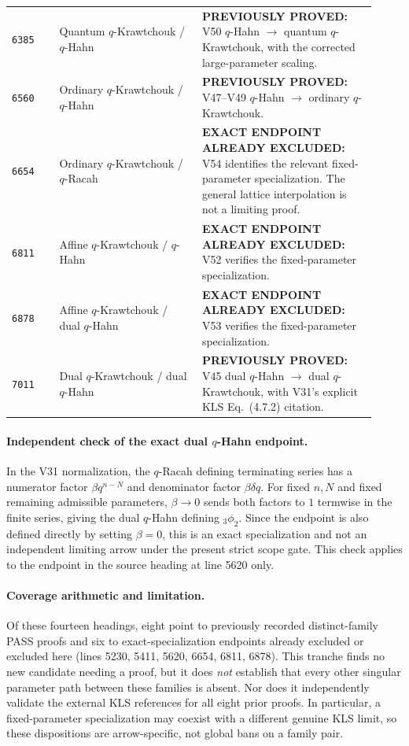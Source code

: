 \documentclass[11pt]{article}
\begin{document}
\begin{longtable}{@{}p{0.12\linewidth}p{0.36\linewidth}p{0.44\linewidth}@{}}
\texttt{6385} & Quantum $q$-Krawtchouk / $q$-Hahn & \textbf{PREVIOUSLY PROVED:} V50 $q$-Hahn $\to$ quantum $q$-Krawtchouk, with the corrected large-parameter scaling. \\
\texttt{6560} & Ordinary $q$-Krawtchouk / $q$-Hahn & \textbf{PREVIOUSLY PROVED:} V47--V49 $q$-Hahn $\to$ ordinary $q$-Krawtchouk. \\
\texttt{6654} & Ordinary $q$-Krawtchouk / $q$-Racah & \textbf{EXACT ENDPOINT ALREADY EXCLUDED:} V54 identifies the relevant fixed-parameter specialization. The general lattice interpolation is not a limiting proof. \\
\texttt{6811} & Affine $q$-Krawtchouk / $q$-Hahn & \textbf{EXACT ENDPOINT ALREADY EXCLUDED:} V52 verifies the fixed-parameter specialization. \\
\texttt{6878} & Affine $q$-Krawtchouk / dual $q$-Hahn & \textbf{EXACT ENDPOINT ALREADY EXCLUDED:} V53 verifies the fixed-parameter specialization. \\
\texttt{7011} & Dual $q$-Krawtchouk / dual $q$-Hahn & \textbf{PREVIOUSLY PROVED:} V45 dual $q$-Hahn $\to$ dual $q$-Krawtchouk, with V31's explicit KLS Eq.~(4.7.2) citation. \\
\end{longtable}

\paragraph{Independent check of the exact dual $q$-Hahn endpoint.}
In the V31 normalization, the $q$-Racah defining terminating series has a numerator factor $\beta q^{n-N}$ and denominator factor $\beta\delta q$. For fixed $n,N$ and fixed remaining admissible parameters, $\beta\to0$ sends both factors to $1$ termwise in the finite series, giving the dual $q$-Hahn defining ${}_3\phi_2$. Since the endpoint is also defined directly by setting $\beta=0$, this is an exact specialization and not an independent limiting arrow under the present strict scope gate. This check applies to the endpoint in the source heading at line 5620 only.

\paragraph{Coverage arithmetic and limitation.}
Of these fourteen headings, eight point to previously recorded distinct-family PASS proofs and six to exact-specialization endpoints already excluded or excluded here (lines 5230, 5411, 5620, 6654, 6811, 6878). This tranche finds no new candidate needing a proof, but it does \emph{not} establish that every other singular parameter path between these families is absent. Nor does it independently validate the external KLS references for all eight prior proofs. In particular, a fixed-parameter specialization may coexist with a different genuine KLS limit, so these dispositions are arrow-specific, not global bans on a family pair.
\end{document}
